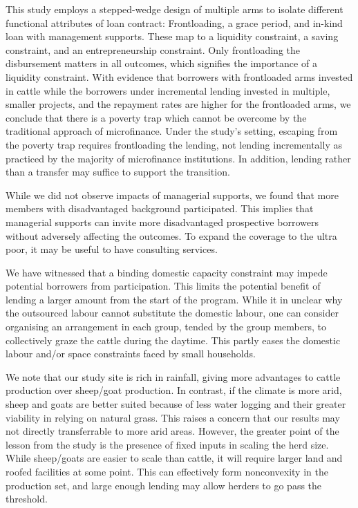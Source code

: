 	This study employs a stepped-wedge design of multiple arms to isolate different functional attributes of loan contract: Frontloading, a grace period, and in-kind loan with management supports. These map to a liquidity constraint, a saving constraint, and an entrepreneurship constraint. Only frontloading the disbursement matters in all outcomes, which signifies the importance of a liquidity constraint. With evidence that borrowers with frontloaded arms invested in cattle while the borrowers under incremental lending invested in multiple, smaller projects, and the repayment rates are higher for the frontloaded arms, we conclude that there is a poverty trap which cannot be overcome by the traditional approach of microfinance. Under the study's setting, escaping from the poverty trap requires frontloading the lending, not lending incrementally as practiced by the majority of microfinance institutions. In addition, lending rather than a transfer may suffice to support the transition. 
	
	While we did not observe impacts of managerial supports, we found that more members with disadvantaged background participated. This implies that managerial supports can invite more disadvantaged prospective borrowers without adversely affecting the outcomes. To expand the coverage to the ultra poor, it may be useful to have consulting services.
	
	We have witnessed that a binding domestic capacity constraint may impede potential borrowers from participation. This limits the potential benefit of lending a larger amount from the start of the program. While it in unclear why the outsourced labour cannot substitute the domestic labour, one can consider organising an arrangement in each group, tended by the group members, to collectively graze the cattle during the daytime. This partly eases the domestic labour and/or space constraints faced by small households. 

	We note that our study site is rich in rainfall, giving more advantages to cattle production over sheep/goat production. In contrast, if the climate is more arid, sheep and goats are better suited because of less water logging and their greater viability in relying on natural grass. This raises a concern that our results may not directly transferrable to more arid areas. However, the greater point of the lesson from the study is the presence of fixed inputs in scaling the herd size. While sheep/goats are easier to scale than cattle, it will require larger land and roofed facilities at some point. This can effectively form nonconvexity in the production set, and large enough lending may allow herders to go pass the threshold. 

